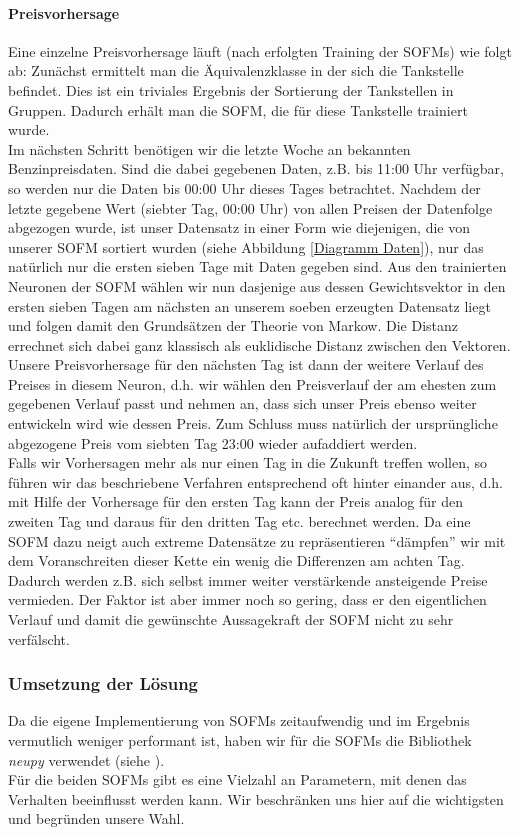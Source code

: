 \documentclass[11pt]{article}
\begin{document}
	\paragraph{Preisvorhersage\\}
	Eine einzelne Preisvorhersage läuft (nach erfolgten Training der SOFMs) wie folgt ab: Zunächst ermittelt man die Äquivalenzklasse in der sich die Tankstelle befindet. Dies ist ein triviales Ergebnis der Sortierung der Tankstellen in Gruppen. Dadurch erhält man die SOFM, die für diese Tankstelle trainiert wurde.\\
	Im nächsten Schritt benötigen wir die letzte Woche an bekannten Benzinpreisdaten. Sind die dabei gegebenen Daten, z.B. bis 11:00 Uhr verfügbar, so werden nur die Daten bis 00:00 Uhr dieses Tages betrachtet. Nachdem der letzte gegebene Wert (siebter Tag, 00:00 Uhr) von allen Preisen der Datenfolge abgezogen wurde, ist unser Datensatz in einer Form wie diejenigen, die von unserer SOFM sortiert wurden (siehe Abbildung \ref{Diagramm Daten}), nur das natürlich nur die ersten sieben Tage mit Daten gegeben sind. Aus den trainierten Neuronen der SOFM wählen wir nun dasjenige aus dessen Gewichtsvektor in den ersten sieben Tagen am nächsten an unserem soeben erzeugten Datensatz liegt und folgen damit den Grundsätzen der Theorie von Markow. Die Distanz errechnet sich dabei ganz klassisch als euklidische Distanz zwischen den Vektoren. Unsere Preisvorhersage für den nächsten Tag ist dann der weitere Verlauf des Preises in diesem Neuron, d.h. wir wählen den Preisverlauf der am ehesten zum gegebenen Verlauf passt und nehmen an, dass sich unser Preis ebenso weiter entwickeln wird wie dessen Preis. Zum Schluss muss natürlich der ursprüngliche abgezogene Preis vom siebten Tag 23:00 wieder aufaddiert werden.\\
	Falls wir Vorhersagen mehr als nur einen Tag in die Zukunft treffen wollen, so führen wir das beschriebene Verfahren entsprechend oft hinter einander aus, d.h. mit Hilfe der Vorhersage für den ersten Tag kann der Preis analog für den zweiten Tag und daraus für den dritten Tag etc. berechnet werden. Da eine SOFM dazu neigt auch extreme Datensätze zu repräsentieren "`dämpfen"' wir mit dem Voranschreiten dieser Kette ein wenig die Differenzen am achten Tag. Dadurch werden z.B. sich selbst immer weiter verstärkende ansteigende Preise vermieden. Der Faktor ist aber immer noch so gering, dass er den eigentlichen Verlauf und damit die gewünschte Aussagekraft der SOFM nicht zu sehr verfälscht.

\subsubsection{Umsetzung der Lösung}
	Da die eigene Implementierung von SOFMs zeitaufwendig und im Ergebnis vermutlich weniger performant ist, haben wir für die SOFMs die Bibliothek \textit{neupy} verwendet (siehe \cite{neupy}).\\
	Für die beiden SOFMs gibt es eine Vielzahl an Parametern, mit denen das Verhalten beeinflusst werden kann. Wir beschränken uns hier auf die wichtigsten und begründen unsere Wahl.
\end{document}
